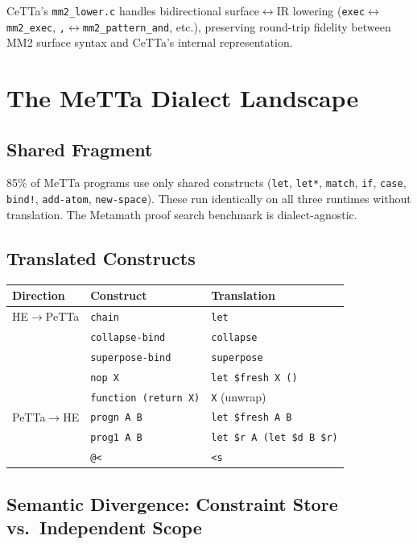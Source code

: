 \documentclass[11pt]{article}
\newcommand{\code}[1]{\texttt{#1}}
\newcommand{\PeTTa}{\textup{PeTTa}}
\newcommand{\HE}{\textup{HE}}
\newcommand{\CeTTa}{\textup{CeTTa}}
\begin{document}
\CeTTa{}'s \code{mm2\_lower.c} handles bidirectional
surface$\leftrightarrow$IR lowering
(\code{exec}$\leftrightarrow$\code{mm2\_exec},
\code{,}$\leftrightarrow$\code{mm2\_pattern\_and}, etc.), preserving
round-trip fidelity between MM2 surface syntax and \CeTTa{}'s internal
representation.

\section{The MeTTa Dialect Landscape}

\subsection{Shared Fragment}

85\% of MeTTa programs use only shared constructs (\code{let},
\code{let*}, \code{match}, \code{if}, \code{case}, \code{bind!},
\code{add-atom}, \code{new-space}).  These run identically on all three
runtimes without translation.  The Metamath proof search benchmark is
dialect-agnostic.

\subsection{Translated Constructs}

\begin{center}
\begin{tabular}{lll}
\toprule
Direction & Construct & Translation \\
\midrule
\HE{}$\to$\PeTTa{} & \code{chain} & \code{let} \\
& \code{collapse-bind} & \code{collapse} \\
& \code{superpose-bind} & \code{superpose} \\
& \code{nop X} & \code{let \$fresh X ()} \\
& \code{function (return X)} & \code{X} (unwrap) \\
\PeTTa{}$\to$\HE{} & \code{progn A B} & \code{let \$fresh A B} \\
& \code{prog1 A B} & \code{let \$r A (let \$d B \$r)} \\
& \code{@<} & \code{<s} \\
\bottomrule
\end{tabular}
\end{center}

\subsection{Semantic Divergence: Constraint Store vs.\ Independent Scope}
\end{document}
